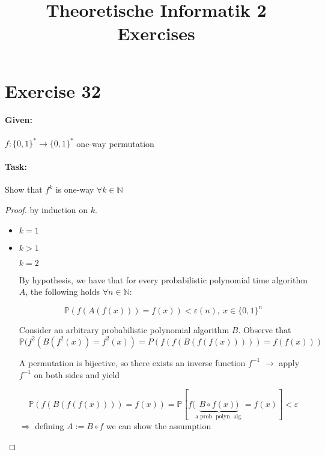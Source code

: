 \documentclass[11pt]{article}
\theoremstyle{definition}
\theoremstyle{definition}
\begin{document}
\setlength{\parindent}{0pt}


\title{Theoretische Informatik 2 Exercises}
\author{}
\date {}

\maketitle

\section*{Exercise 32}

\paragraph{Given:}
$ f: \{0, 1\}^\ast \rightarrow \{0, 1\}^\ast $ one-way permutation

\paragraph{Task:} Show that $ f^k $ is one-way $ \forall k \in \mathbb{N} $

\begin{proof}

by induction on $ k $.

\begin{itemize}
\item $ k = 1 $
\item $ k > 1 $

	$ k = 2 $
	
	By hypothesis, we have that for every probabilistic polynomial time algorithm $ A $, the following holds $ \forall n \in \mathbb{N} $:
	
	\[ \mathbb{P}(f (A(f(x))) = f(x) ) < \varepsilon(n),~ x \in \{0, 1\}^n \]
	
	Consider an arbitrary probabilistic polynomial algorithm $ B $. Observe that 
	\[ \mathbb{P}(f^2 (B (f^2(x)) = f^2(x) ) = P(f(f(B(f(f(x))))) = f(f(x))) \]
	
	A permutation is bijective, so there exists an inverse function $ f^{-1} $ $ \rightarrow $ apply $ f^{-1} $ on both sides and yield
	
	\[ \mathbb{P} (f(B(f(f(x)))) = f(x)) = \mathbb{P}[ f(\underbrace{B \circ f(x))}_{\text{a prob. polyn. alg.}} = f(x)] < \varepsilon \]
	$ \Rightarrow $ defining $A:= B \circ f $ we can show the assumption
\end{itemize}

\end{proof}
\end{document}

